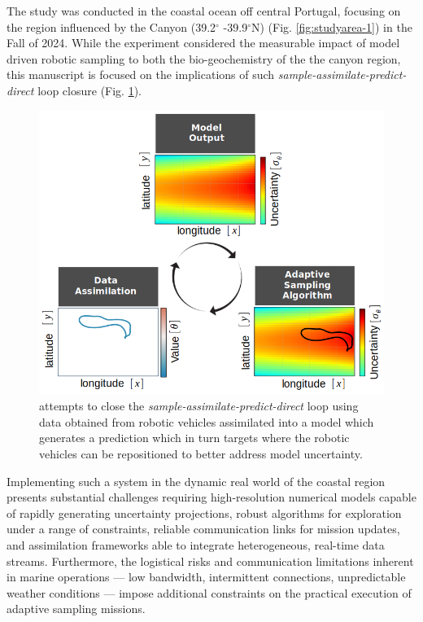 The study was conducted in the coastal ocean off central Portugal,
focusing on the region influenced by the \naz Canyon (39.2$^{\circ}$
-39.9$^{\circ}$N) (Fig. \ref{fig:studyarea-1}) in the Fall of
2024. While the experiment considered the measurable impact of model
driven robotic sampling to both the bio-geochemistry of the the canyon
region, this manuscript is focused on the implications of such
\emph{sample-assimilate-predict-direct} loop closure
(Fig. \ref{fig:loop-closure}).



\begin{figure}
  \centering
 \includegraphics[scale=0.2]{fig/data_cycle.png}
  \caption{\proj attempts to close the
    \emph{sample-assimilate-predict-direct} loop using data obtained
    from robotic vehicles assimilated into a model which generates a
    prediction which in turn targets where the robotic vehicles can be
    repositioned to better address model uncertainty.}
  \label{fig:loop-closure}
\end{figure}


Implementing such a system in the dynamic real world of the coastal
region presents substantial challenges requiring high-resolution
numerical models capable of rapidly generating uncertainty
projections, robust algorithms for exploration under a range of
constraints, reliable communication links for mission updates, and
assimilation frameworks able to integrate heterogeneous, real-time
data streams. Furthermore, the logistical risks and communication
limitations inherent in marine operations — low bandwidth,
intermittent connections, unpredictable weather conditions — impose
additional constraints on the practical execution of adaptive sampling
missions.

